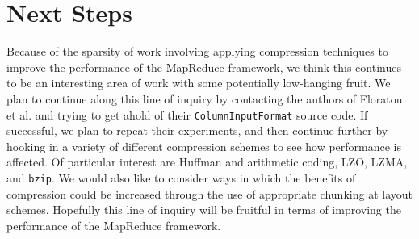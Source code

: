 \documentclass[twocolumn]{article}
\begin{document}
\section{Next Steps}

Because of the sparsity of work involving applying compression techniques
to improve the performance of the MapReduce framework, we think this continues
to be an interesting area of work with some potentially low-hanging fruit.
We plan to continue along this line of inquiry by contacting the authors
of Floratou et al. and trying to get ahold of their \verb+ColumnInputFormat+
source code.  If successful, we plan to repeat their experiments, and then
continue further by hooking in a variety of different compression schemes
to see how performance is affected.  Of particular interest are Huffman
and arithmetic coding, LZO,
LZMA, and \verb+bzip+.  We would also like to consider ways in which
the benefits of compression could be increased through the use of
appropriate chunking at layout schemes.  Hopefully this line of inquiry
will be fruitful in terms of improving the performance of the MapReduce
framework.
\end{document}
